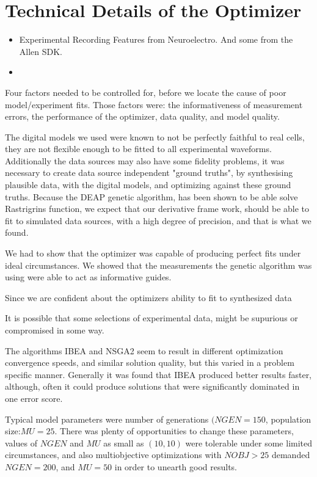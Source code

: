 \section*{Technical Details of the Optimizer}
\begin{itemize}
\item Experimental Recording Features from Neuroelectro. And some from the Allen SDK.
\item 
\end{itemize}

Four factors needed to be controlled for, before we locate the cause of poor model/experiment fits. Those factors were: the informativeness of measurement errors, the performance of the optimizer, data quality, and model quality.

The digital models we used were known to not be perfectly faithful to real cells, they are not flexible enough to be fitted to all experimental waveforms. Additionally the data sources may also have some fidelity problems, it was necessary to create data source independent "ground truths", by synthesising plausible data, with the digital models, and optimizing against these ground truths. Because the DEAP genetic algorithm, has been shown to be able solve Rastrigrins function, we expect that our derivative frame work, should be able to fit to simulated data sources, with a high degree of precision, and that is what we found.



We had to show that the optimizer was capable of producing perfect fits under ideal circumstances. We showed that the measurements the genetic algorithm was using were able to act as informative guides. 

Since we are confident about the optimizers ability to fit to synthesized data

It is possible that some selections of experimental data, might be supurious or compromised in some way.  

The algorithms IBEA and NSGA2 seem to result in different optimization convergence speeds, and similar solution quality, but this varied in a problem specific manner. Generally it was found that IBEA produced better results faster, although, often it could produce solutions that were significantly dominated in one error score.

Typical model parameters were number of generations $(NGEN=150$, population size:$MU=25$. There was plenty of opportunities to change these parameters,  values of $NGEN$ and $MU$ as small as $(10,10)$ were tolerable under some limited circumstances, and also multiobjective optimizations with $NOBJ>25$ demanded $NGEN=200$, and $MU=50$ in order to unearth good results.

